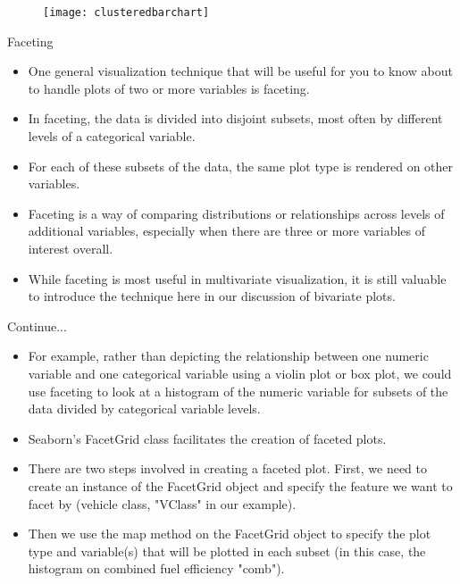 \documentclass[12pt]{beamer}
\begin{document}
    \begin{frame}{}
    	\begin{figure}
    		\centering
    		\texttt{[image: clusteredbarchart]}
    	\end{figure}
    \end{frame}
    \begin{frame}{Faceting}
    	\begin{itemize}
    		\item One general visualization technique that will be useful for you to know about to handle plots of two or more variables is faceting.
    		\item  In faceting, the data is divided into disjoint subsets, most often by different levels of a categorical variable.
    		\item For each of these subsets of the data, the same plot type is rendered on other variables.
    		\item Faceting is a way of comparing distributions or relationships across levels of additional variables, especially when there are three or more variables of interest overall.
    		\item While faceting is most useful in multivariate visualization, it is still valuable to introduce the technique here in our discussion of bivariate plots.
    	\end{itemize}
    \end{frame}
    \begin{frame}{Continue...}
    	\begin{itemize}
    		\item For example, rather than depicting the relationship between one numeric variable and one categorical variable using a violin plot or box plot, we could use faceting to look at a histogram of the numeric variable for subsets of the data divided by categorical variable levels.
    		\item Seaborn's FacetGrid class facilitates the creation of faceted plots.
    		\item There are two steps involved in creating a faceted plot. First, we need to create an instance of the FacetGrid object and specify the feature we want to facet by (vehicle class, "VClass" in our example). 
    		\item Then we use the map method on the FacetGrid object to specify the plot type and variable(s) that will be plotted in each subset (in this case, the histogram on combined fuel efficiency "comb").
    	\end{itemize}
    \end{frame}
\end{document}
